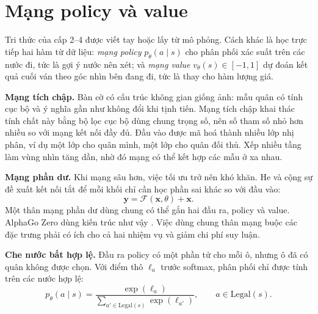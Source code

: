 \section{Mạng policy và value}
\label{sec:lt-mang}
Tri thức của cấp 2--4 được viết tay hoặc lấy từ mô phỏng. Cách khác là học trực tiếp hai hàm từ dữ liệu: \emph{mạng policy} $p_\theta(a \mid s)$ cho phân phối xác suất trên các nước đi, tức là gợi ý nước nên xét; và \emph{mạng value} $v_\theta(s) \in [-1, 1]$ dự đoán kết quả cuối ván theo góc nhìn bên đang đi, tức là thay cho hàm lượng giá.

\textbf{Mạng tích chập.} Bàn cờ có cấu trúc không gian giống ảnh: mẫu quân có tính cục bộ và ý nghĩa gần như không đổi khi tịnh tiến. Mạng tích chập khai thác tính chất này bằng bộ lọc cục bộ dùng chung trọng số, nên số tham số nhỏ hơn nhiều so với mạng kết nối đầy đủ. Đầu vào được mã hoá thành nhiều lớp nhị phân, ví dụ một lớp cho quân mình, một lớp cho quân đối thủ. Xếp nhiều tầng làm vùng nhìn tăng dần, nhờ đó mạng có thể kết hợp các mẫu ở xa nhau.

\textbf{Mạng phần dư.} Khi mạng sâu hơn, việc tối ưu trở nên khó khăn. He và cộng sự \cite{he2016resnet} đề xuất kết nối tắt để mỗi khối chỉ cần học phần sai khác so với đầu vào:
\begin{equation}
  \mathbf{y} = \mathcal{F}(\mathbf{x}, \theta) + \mathbf{x}.
\end{equation}
Một thân mạng phần dư dùng chung có thể gắn hai đầu ra, policy và value. AlphaGo Zero dùng kiến trúc như vậy \cite{silver2017alphagozero}. Việc dùng chung thân mạng buộc các đặc trưng phải có ích cho cả hai nhiệm vụ và giảm chi phí suy luận.

\textbf{Che nước bất hợp lệ.} Đầu ra policy có một phần tử cho mỗi ô, nhưng ô đã có quân không được chọn. Với điểm thô $\ell_a$ trước softmax, phân phối chỉ được tính trên các nước hợp lệ:
\begin{equation}
  p_\theta(a \mid s) = \frac{\exp(\ell_a)}{\sum_{a' \in \text{Legal}(s)} \exp(\ell_{a'})}, \qquad a \in \text{Legal}(s).
\end{equation}

